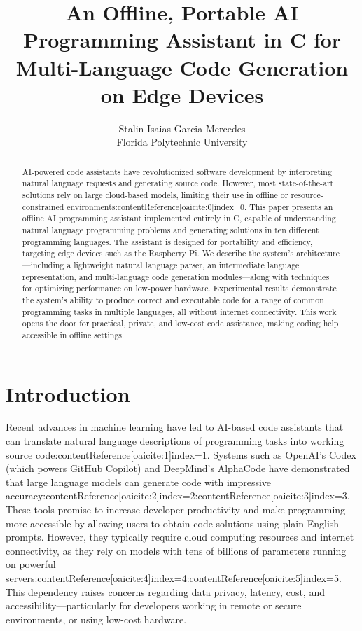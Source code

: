 \documentclass[12pt]{article}
\begin{document}
\title{An Offline, Portable AI Programming Assistant in C for Multi-Language Code Generation on Edge Devices}
\author{Stalin Isaias Garcia Mercedes\\
Florida Polytechnic University}
\date{}
\maketitle

\begin{abstract}
\noindent 
AI-powered code assistants have revolutionized software development by interpreting natural language requests and generating source code. However, most state-of-the-art solutions rely on large cloud-based models, limiting their use in offline or resource-constrained environments:contentReference[oaicite:0]{index=0}. This paper presents an offline AI programming assistant implemented entirely in C, capable of understanding natural language programming problems and generating solutions in ten different programming languages. The assistant is designed for portability and efficiency, targeting edge devices such as the Raspberry Pi. We describe the system's architecture—including a lightweight natural language parser, an intermediate language representation, and multi-language code generation modules—along with techniques for optimizing performance on low-power hardware. Experimental results demonstrate the system’s ability to produce correct and executable code for a range of common programming tasks in multiple languages, all without internet connectivity. This work opens the door for practical, private, and low-cost code assistance, making coding help accessible in offline settings. 
\end{abstract}

\section{Introduction}
\noindent 
Recent advances in machine learning have led to AI-based code assistants that can translate natural language descriptions of programming tasks into working source code:contentReference[oaicite:1]{index=1}. Systems such as OpenAI’s Codex (which powers GitHub Copilot) and DeepMind’s AlphaCode have demonstrated that large language models can generate code with impressive accuracy:contentReference[oaicite:2]{index=2}:contentReference[oaicite:3]{index=3}. These tools promise to increase developer productivity and make programming more accessible by allowing users to obtain code solutions using plain English prompts. However, they typically require cloud computing resources and internet connectivity, as they rely on models with tens of billions of parameters running on powerful servers:contentReference[oaicite:4]{index=4}:contentReference[oaicite:5]{index=5}. This dependency raises concerns regarding data privacy, latency, cost, and accessibility—particularly for developers working in remote or secure environments, or using low-cost hardware.
\end{document}
